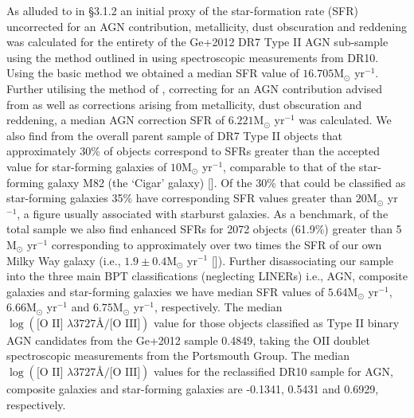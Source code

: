 As alluded to in §3.1.2 an initial proxy of the star-formation rate (SFR) uncorrected for an AGN contribution, metallicity, dust obscuration and reddening was calculated for the entirety of the Ge+2012 DR7 Type II AGN sub-sample using the method outlined in \cite{Kennicutt_1998} using spectroscopic measurements from DR10. Using the basic \cite{Kennicutt_1998} method we obtained a median SFR value of $16.705\text{M}_{\odot}$ yr$^{-1}$. Further utilising the method of \cite{Kewley_2004}, correcting for an AGN contribution advised from \cite{2006ApJ...642..702K} as well as corrections arising from metallicity, dust obscuration and reddening, a median AGN correction SFR of $6.221\text{M}_{\odot}$ yr$^{-1}$ was calculated. We also find from the overall parent sample of DR7 Type II objects that approximately 30\% of objects correspond to SFRs greater than the accepted value for star-forming galaxies of $10\text{M}_{\odot}$ yr$^{-1}$, comparable to that of the star-forming galaxy M82 (the ‘Cigar’ galaxy) [\cite{2003ApJ...599..193F}]. Of the 30\% that could be classified as star-forming galaxies 35\% have corresponding SFR values greater than $20\text{M}_{\odot}$ yr$^{-1}$, a figure usually associated with starburst galaxies. As a benchmark, of the total sample we also find enhanced SFRs for 2072 objects (61.9\%) greater than 5 M$_{\odot}$ yr$^{-1}$ corresponding to approximately over two times the SFR of our own Milky Way galaxy (i.e., $1.9\pm{0.4}\text{M}_{\odot}$ yr$^{-1}$ [\cite{2011AJ....142..197C}]). Further disassociating our sample into the three main BPT classifications (neglecting LINERs) i.e., AGN, composite galaxies and star-forming galaxies we have median SFR values of $5.64\text{M}_{\odot}$ yr$^{-1}$, $6.66\text{M}_{\odot}$ yr$^{-1}$ and $6.75\text{M}_{\odot}$ yr$^{-1}$, respectively. The median $\log{(\text{[O II] }{\lambda}3727Å\text{/[O III]})}$ value for those objects classified as Type II binary AGN candidates from the Ge+2012 sample 0.4849, taking the OII doublet spectroscopic measurements from the Portsmouth Group. The median $\log{(\text{[O II] }{\lambda}3727Å\text{/[O III]})}$ values for the reclassified DR10 sample for AGN, composite galaxies and star-forming galaxies are -0.1341, 0.5431 and 0.6929, respectively.       